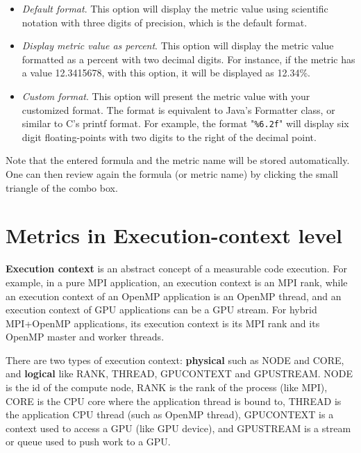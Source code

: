\begin{itemize}
\begin{itemize}
\item \textit{Default format}. This option will display the metric value using scientific notation with three digits of precision, which is the default format.

\item \textit{Display metric value as percent}. This option will display the metric value formatted as a percent with two decimal digits. For instance, if the metric has a value 12.3415678, with this option, it will be displayed as 12.34\%.

\item \textit{Custom format}. This option will present the metric value with your customized format. The format is equivalent to Java's Formatter class, or similar to C's printf format. For example, the format "\texttt{\%6.2f}" will display six digit floating-points with two digits to the right of the decimal point.

\end{itemize}

\end{itemize}

Note that the entered formula and the metric name will be stored automatically.
One can then review again the formula (or metric name) by clicking the small triangle of the combo box.



\section{Metrics in Execution-context level}
\label{sec:hpcviewer:thread-level}

\textbf{Execution context} is an abstract concept of a measurable code execution.
For example, in a pure MPI application, an execution context is an MPI rank, 
while an execution context of an OpenMP application is an OpenMP thread,
and an execution context of GPU applications can be a GPU stream.
For hybrid MPI+OpenMP applications, its execution context is its MPI rank and its OpenMP master and worker threads.

There are two types of execution context: \textbf{physical} such as NODE and CORE, and \textbf{logical} like RANK, THREAD, GPUCONTEXT and GPUSTREAM.
NODE is the id of the compute node, RANK is the rank of the process (like MPI), 
CORE is the CPU core where the application thread is bound to, 
THREAD is the application CPU thread (such as OpenMP thread),
GPUCONTEXT is a context used to access a GPU (like GPU device), and
GPUSTREAM is a stream or queue used to push work to a GPU.

